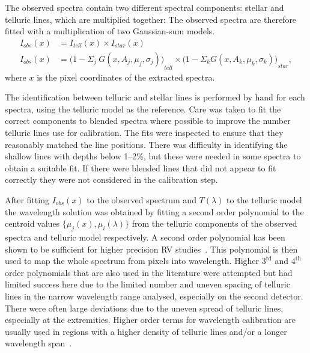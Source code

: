 The observed spectra contain two different spectral components: stellar and telluric lines, which are multiplied together: The observed spectra are therefore fitted with a multiplication of two Gaussian-sum models.
\begin{align}
I_{obs}(x) &= {I}_{tell}(x) \times {I}_{star}(x) \nonumber \\
I_{obs}(x) &= {\Big(1 - {\Sigma}_{j}\ G(x, A_{j}, {\mu}_{j}, {\sigma}_{j})\Big)}_{tell} \times {\Big(1 - {\Sigma}_{k} G(x, A_{k}, {\mu}_{k}, {\sigma}_{k})\Big)}_{star}, \label{eqn:obs}
\end{align}
where \(x\) is the pixel coordinates of the extracted spectra.

The identification between telluric and stellar lines is performed by hand for each spectra, using the telluric model as the reference.
Care was taken to fit the correct components to blended spectra where possible to improve the number telluric lines use for calibration.
The fits were inspected to ensure that they reasonably matched the line positions.
There was difficulty in identifying the shallow lines with depths below 1--2\%, but these were needed in some spectra to obtain a suitable fit.
If there were blended lines that did not appear to fit correctly they were not considered in the calibration step.

After fitting \(I_{obs}(x)\) to the observed spectrum and \(T(\lambda)\) to the telluric model the wavelength solution was obtained by fitting a second order polynomial to the centroid values \(\{\mu_{j}(x), \mu_{i}(\lambda)\}\) from the telluric components of the observed spectra and telluric model respectively.
A second order polynomial has been shown to be sufficient for higher precision {RV} studies~\citep[e.g.][]{bean_groundbased_2010, figueira_radial_2010}.
This polynomial is then used to map the whole spectrum from pixels into wavelength.
Higher \(3^{\textrm{rd}}\) and \(4^{\textrm{th}}\) order polynomials that are also used in the literature \citet[e.g.][]{seifahrt_synthesising_2010, ulmer-moll_telluric_2018} were attempted but had limited success here due to the limited number and uneven spacing of telluric lines in the narrow wavelength range analysed, especially on the second detector.
There were often large deviations due to the uneven spread of telluric lines, especially at the extremities.
Higher order terms for wavelength calibration are usually used in regions with a higher density of telluric lines and/or a longer wavelength span~\citep{piskorz_evidence_2016, seifahrt_synthesising_2010, ulmer-moll_telluric_2018}.

